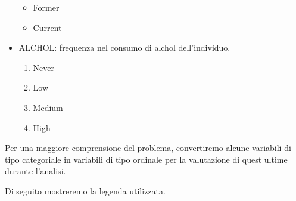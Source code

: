\documentclass{article}\usepackage[]{graphicx}\usepackage[]{xcolor}
\begin{document}
\begin{itemize}
\begin{itemize}
          \item Former
          \item Current
        \end{itemize}
      \item ALCHOL: frequenza nel consumo di alchol dell'individuo.
        \begin{enumerate}
          \item Never 
          \item Low
          \item Medium
          \item High
        \end{enumerate}
    \end{itemize}
  
    Per una maggiore comprensione del problema, convertiremo alcune variabili di
    tipo categoriale in variabili di tipo ordinale per la valutazione di 
    quest ultime durante l'analisi. \par
    Di seguito mostreremo la legenda utilizzata.
    
\end{document}

